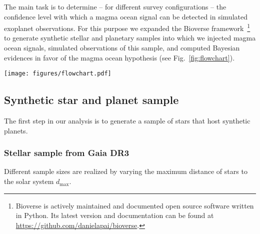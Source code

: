 \documentclass[modern]{aastex631}
\begin{document}
The main task is to determine -- for different survey configurations -- the confidence level with which a magma ocean signal can be detected in simulated exoplanet observations.
For this purpose we expanded the Bioverse framework~\citep{Bixel2020,Bixel2021}\footnote{Bioverse is actively maintained and documented open source software written in Python. Its latest version and documentation can be found at \url{https://github.com/danielapai/bioverse}.} to generate synthetic stellar and planetary samples into which we injected magma ocean signals, simulated observations of this sample, and computed Bayesian evidences in favor of the magma ocean hypothesis (see Fig.~\ref{fig:flowchart}).
\begin{figure*}
    \begin{centering}
        \texttt{[image: figures/flowchart.pdf]}
        \caption{Workflow of our hypothesis testing with Bioverse. In the first block, a stellar sample is generated based on the Gaia nearby stars catalog~\citep{Smart2021}. The stars are then populated with planets based on Kepler demographics, and they may be assigned a magma ocean based on the model described in Sect.~\ref{sec:mo_model}. The planets' respective transit probabilities are computed. The second block simulates the exoplanet survey whereby selection effects and detection biases are introduced. Finally, the third block deals with testing a hypothesis based on the data from the simulated survey. By iterating through these steps, we compute the statistical power of testing the hypothesis given the assumed survey design.}
        \label{fig:flowchart}
    \end{centering}
\end{figure*}



\subsection{Synthetic star and planet sample}
The first step in our analysis is to generate a sample of stars that host synthetic planets.

\subsubsection{Stellar sample from Gaia DR3}
Different sample sizes are realized by varying the maximum distance of stars to the solar system $d_\mathrm{max}$.
\end{document}
